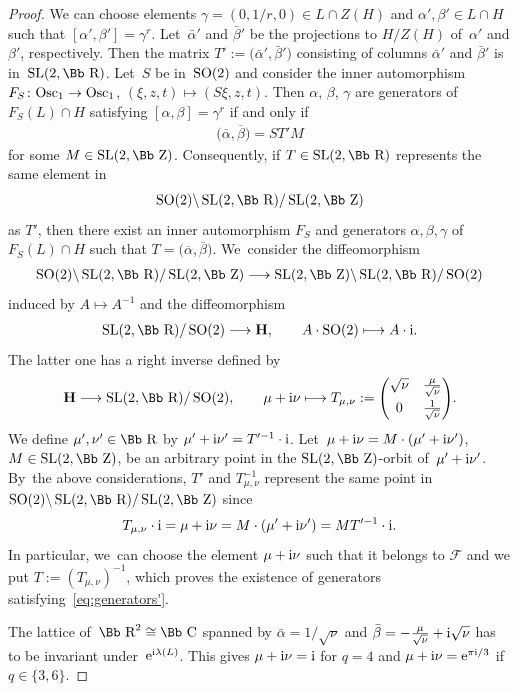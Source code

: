 \documentclass[pdftex]{sigma}
\newcommand\CC{{\mbox{\Bb C}}}
\newcommand\RR{{\mbox{\Bb R}}}
\newcommand\ZZ{{\mbox{\Bb Z}}}
\newcommand\cF{{\mathcal F}}
\newcommand{\SL}{\mathop{{\rm SL}}}
\newcommand{\SO}{\mathop{{\rm SO}}}
\newcommand{\Osc}{{\rm Osc}}
\numberwithin{equation}{section}
\begin{document}
\begin{proof}
We can choose elements $\gamma=(0,1/r,0)\in L\cap Z(H)$ and $\alpha', \beta' \in L\cap H$ such that $[\alpha',\beta']=\gamma^r$. Let~$\bar \alpha'$ and $\bar\beta'$ be the projections to $H/Z(H)$ of~$\alpha'$ and $\beta'$, respectively.
Then the matrix $T':=\big(\bar \alpha',\bar\beta'\big)$ consisting of columns $\bar \alpha'$ and $\bar \beta'$ is in~$\SL(2,\RR)$. Let~$S$ be in~$\SO(2)$ and consider the inner automorphism $F_S\colon \Osc_1 \to \Osc_1$, $(\xi,z,t)\mapsto (S\xi,z,t)$. Then $\alpha$, $\beta$, $\gamma$ are generators of~$F_S(L)\cap H$ satisfying $[\alpha,\beta]=\gamma^r$ if and only if
\begin{gather*}
\big(\overline{\alpha},\overline{\beta}\big) = ST'M
\end{gather*}
for some $M\in\SL(2,\ZZ)$. Consequently, if $T\in \SL(2,\RR)$ represents the same element in
\begin{gather*}
\SO(2)\backslash \SL(2,\RR)/\SL(2,\ZZ)
\end{gather*} as $T'$, then there exist an inner automorphism $F_S$ and generators $\alpha,\beta,\gamma$ of~$F_S(L)\cap H$ such that $T=\big(\overline{\alpha},\overline{\beta}\big)$. We~consider the diffeomorphism
\begin{gather*}
\SO(2)\backslash \SL(2,\RR)/\SL(2,\ZZ) \longrightarrow \SL(2,\ZZ)\backslash \SL(2,\RR)/\SO(2)
\end{gather*}
induced by $A\mapsto A^{-1}$ and the diffeomorphism
\begin{gather*}
\SL(2,\RR)/\SO(2) \longrightarrow \textbf{H},\qquad A\cdot \SO(2)\longmapsto A\cdot {\rm i}.
\end{gather*}
The latter one has a right inverse defined by
\begin{gather}\label{Tmunu}
\textbf{H}\longrightarrow\SL(2,\RR)/\SO(2) ,\qquad
\mu+{\rm i}\nu \longmapsto T_{\mu,\nu}:=
\begin{pmatrix}
\sqrt\nu&\frac{\mu}{\sqrt\nu}
\\[1ex]
0&\frac 1{\sqrt\nu}
\end{pmatrix}\!.
\end{gather}
We define $\mu',\nu'\in\RR$ by $\mu'+{\rm i}\nu'=T'^{-1} \cdot {\rm i}$. Let~$\mu+{\rm i}\nu=M \cdot (\mu'+{\rm i}\nu')$, $M\in\SL(2,\ZZ)$, be an arbitrary point in the $\SL(2,\ZZ)$-orbit of~$\mu'+{\rm i}\nu'$. By~the above considerations, $T'$ and $T^{-1}_{\mu,\nu}$ represent the same point in~$\SO(2)\backslash \SL(2,\RR)/\SL(2,\ZZ)$ since
\begin{gather*}
T_{\mu,\nu}\cdot {\rm i} =\mu+{\rm i}\nu=M \cdot (\mu'+{\rm i}\nu')=MT'^{-1}\cdot {\rm i}.
\end{gather*}
In particular, we~can choose the element $\mu+{\rm i}\nu$ such that it belongs to $\cF$ and we put $T:=(T_{\mu,\nu})^{-1}$, which proves the existence of generators satisfying~\eqref{eq:generators'}.

The lattice of~$\RR^2\cong \CC$ spanned by $\bar \alpha = 1/\sqrt \nu$ and $\bar\beta=-\frac{\mu}{\sqrt\nu}+{\rm i}\sqrt\nu$ has to be invariant under~${\rm e}^{{\rm i}\lambda(L)}$. This gives $\mu+{\rm i}\nu={\rm i}$ for $q=4$ and $\mu+{\rm i}\nu= {\rm e}^{\pi {\rm i}/3}$ if $q\in\{3,6\}$.
\end{proof}
\end{document}
